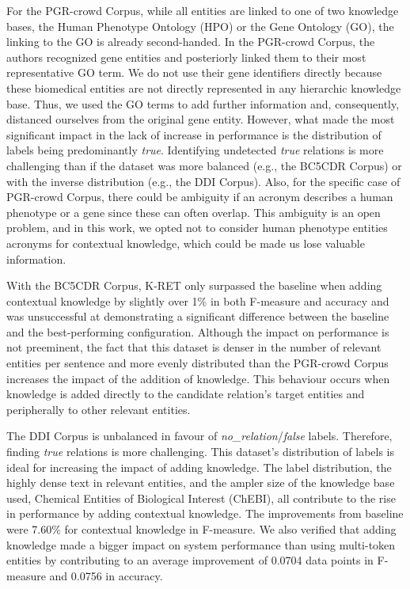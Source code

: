 For the PGR-crowd Corpus, while all entities are linked to one of two knowledge bases, the Human Phenotype Ontology (HPO) or the Gene Ontology (GO), the linking to the GO is already second-handed. In the PGR-crowd Corpus, the authors recognized gene entities and posteriorly linked them to their most representative GO term. We do not use their gene identifiers directly because these biomedical entities are not directly represented in any hierarchic knowledge base. Thus, we used the GO terms to add further information and, consequently, distanced ourselves from the original gene entity. However, what made the most significant impact in the lack of increase in performance is the distribution of labels being predominantly \textit{true}. Identifying undetected \textit{true} relations is more challenging than if the dataset was more balanced (e.g., the BC5CDR Corpus) or with the inverse distribution (e.g., the DDI Corpus). Also, for the specific case of PGR-crowd Corpus, there could be ambiguity if an acronym describes a human phenotype or a gene since these can often overlap. This ambiguity is an open problem, and in this work, we opted not to consider human phenotype entities acronyms for contextual knowledge, which could be made us lose valuable information.   

With the BC5CDR Corpus, K-RET only surpassed the baseline when adding contextual knowledge by slightly over 1\% in both F-measure and accuracy and was unsuccessful at demonstrating a significant difference between the baseline and the best-performing configuration. Although the impact on performance is not preeminent, the fact that this dataset is denser in the number of relevant entities per sentence and more evenly distributed than the PGR-crowd Corpus increases the impact of the addition of knowledge. This behaviour occurs when knowledge is added directly to the candidate relation's target entities and peripherally to other relevant entities. 

The DDI Corpus is unbalanced in favour of \textit{no\_relation}/\textit{false} labels. Therefore, finding \textit{true} relations is more challenging. This dataset's distribution of labels is ideal for increasing the impact of adding knowledge. The label distribution, the highly dense text in relevant entities, and the ampler size of the knowledge base used, Chemical Entities of Biological Interest (ChEBI), all contribute to the rise in performance by adding contextual knowledge. The improvements from baseline were 7.60\% for contextual knowledge in F-measure. We also verified that adding knowledge made a bigger impact on system performance than using multi-token entities by contributing to an average improvement of 0.0704 data points in F-measure and 0.0756 in accuracy. 

